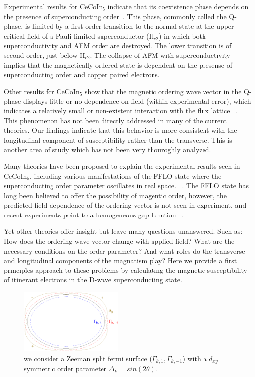 \documentclass[usletter,aps,prb,10pt,amssymb,amsmath,twocolumn]{revtex4-1}
\begin{document}
Experimental results for CeCoIn$_5$ indicate that its coexistence phase depends on the presence of superconducting order~\cite{cecoin5_Bianchi,cecoin5_Kenzelmann,cecoin5_Kenzelmann2}. This phase, commonly called the Q-phase, is limited by a first order transition to the normal state at the upper critical field of a Pauli limited superconductor (H$_{c2}$) in which both superconductivity and AFM order are destroyed. The lower transition is of second order, just below H$_{c2}$. The collapse of AFM with superconductivity implies that the magnetically ordered state is dependent on the presense of superconducting order and copper paired electrons. 

Other results for CeCoIn$_5$ show that the magnetic ordering wave vector in the Q-phase displays little or no dependence on field (within experimental error), which indicates a relatively small or non-existent interaction with the flux lattice ~\cite{cecoin5_Kenzelmann2}. This phenomenon has not been directly addressed in many of the current theories. Our findings indicate that this behavior is more consistent with the longitudinal component of susceptibility rather than the transverse. This is another area of study which has not been very thouroghly analyzed.

Many theories have been proposed to explain the experimental results seen in CeCoIn$_5$, including various manifestations of the FFLO state where the superconducting order parameter oscillates in real space. ~\cite{sc_sdw_anton,mag_afm_fflo_sigrist,fflo_pen_depth,sc_afm_kato,sc_afm_ikeda,sdw_vortex}. The FFLO state has long been believed to offer the possibility of magentic order, however, the predicted field dependence of the ordering vector is not seen in experiment, and recent experiments point to a homogeneous gap function  ~\cite{cecoin5_Kenzelmann2, copperPairsCeCoIn5}. 

Yet other theories offer insight but leave many questions unanswered. Such as: How does the ordering wave vector change with applied field? What are the necessary conditions on the order parameter? And what roles do the transverse and longitudinal components of the magnatism play? Here we provide a first principles approach to these problems by calculating the magnetic susceptibility of itinerant electrons in the D-wave superconducting state. 

\begin{figure}
 \includegraphics[width = 0.45\textwidth, height = 0.39\textwidth]{./figures/fermi_schematic.eps}
 \caption{we consider a Zeeman split fermi surface ($\Gamma_{k,1}, \Gamma_{k, -1}$) with a $d_{xy}$ symmetric order parameter $\Delta_k=sin(2\theta)$. }
 \end{figure}
\end{document}
